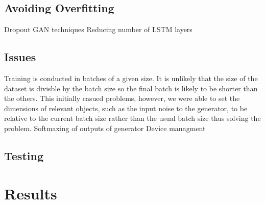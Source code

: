 \subsection{Avoiding Overfitting}
Dropout
GAN techniques
Reducing number of LSTM layers
\subsection{Issues}
Training is conducted in batches of a given size.
It is unlikely that the size of the dataset is divisble by the batch size so the final batch is likely to be shorter than the others.
This initially casued problems, however, we were able to set the dimensions of relevant objects, such as the input noise to the generator, to be relative to the current batch size rather than the usual batch size thus solving the problem.
Softmaxing of outputs of generator
Device managment

\subsection{Testing}
\section{Results}
